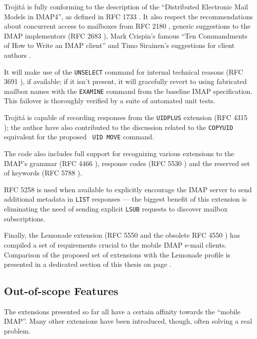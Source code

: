\documentclass[trojita]{subfiles}
\begin{document}
Trojitá is fully conforming to the description of the ``Distributed Electronic Mail Models in IMAP4'', as defined in RFC
1733 \cite{rfc1733}.  It also respect the recommendations about concurrent access to mailboxes from RFC 2180
\cite{rfc2180}, generic suggestions to the IMAP implementors (RFC 2683 \cite{rfc2683}), Mark Crispin's famous ``Ten
Commandments of How to Write an IMAP client'' \cite{crispin-ten-commandments} and Timo Sirainen's suggestions for client
authors \cite{tss-client-coding-howto} \cite{imapwiki-client-best-practices}.

It will make use of the {\tt UNSELECT} command for internal technical reasons (RFC 3691 \cite{rfc3691}), if available;
if it isn't present, it will gracefully revert to using fabricated mailbox names with the {\tt EXAMINE} command from the
baseline IMAP specification.  This failover is thoroughly verified by a suite of automated unit tests.

Trojitá is capable of recording responses from the {\tt UIDPLUS} extension (RFC 4315 \cite{rfc4315}); the author have
also contributed \cite{jkt-move-uidplus} to the discussion related to the {\tt COPYUID} equivalent for the proposed {\tt
UID MOVE} command.

The code also includes full support for recognizing various extensions to the IMAP's grammar (RFC 4466 \cite{rfc4466}),
response codes (RFC 5530 \cite{rfc5530}) and the reserved set of keywords (RFC 5788 \cite{rfc5788}).

RFC 5258 \cite{rfc5258} is used when available to explicitly encourage the IMAP server to send additional metadata in
{\tt LIST} responses --- the biggest benefit of this extension is eliminating the need of sending explicit {\tt LSUB}
requests to discover mailbox subscriptions.

Finally, the Lemonade extension (RFC 5550 \cite{rfc5550} and the obsolete RFC 4550 \cite{rfc4550}) has compiled a set of
requirements crucial to the mobile IMAP e-mail clients.  Comparison of the proposed set of extensions with the Lemonade
profile is presented in a dedicated section of this thesis on page \pageref{sec:lemonade-comparison}.

\subsection{Out-of-scope Features}

The extensions presented so far all have a certain affinity towards the ``mobile IMAP''.  Many other extensions have
been introduced, though, often solving a real problem.
\end{document}
